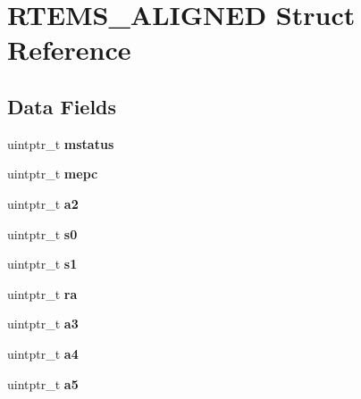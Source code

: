 \hypertarget{structRTEMS__ALIGNED}{}\section{R\+T\+E\+M\+S\+\_\+\+A\+L\+I\+G\+N\+ED Struct Reference}
\label{structRTEMS__ALIGNED}
\subsection*{Data Fields}
\begin{DoxyCompactItemize}
\item 
\mbox{\label{structRTEMS__ALIGNED_ab1aeee5e3cc62d6ea87d066061228938}} 
uintptr\+\_\+t {\bfseries mstatus}
\item 
\mbox{\label{structRTEMS__ALIGNED_a2bf8b77eea08bf08de9a73d4ec26b86b}} 
uintptr\+\_\+t {\bfseries mepc}
\item 
\mbox{\label{structRTEMS__ALIGNED_a78f41eb13460a85fbfe9b8057d766584}} 
uintptr\+\_\+t {\bfseries a2}
\item 
\mbox{\label{structRTEMS__ALIGNED_ac80572a879b3ad227641b200e229396c}} 
uintptr\+\_\+t {\bfseries s0}
\item 
\mbox{\label{structRTEMS__ALIGNED_a06d202b1bf4c6d5bd80d7486503e8804}} 
uintptr\+\_\+t {\bfseries s1}
\item 
\mbox{\label{structRTEMS__ALIGNED_a9afcf738bfd01d583e771063e6ec1c12}} 
uintptr\+\_\+t {\bfseries ra}
\item 
\mbox{\label{structRTEMS__ALIGNED_a134978fa13c4b2bd85a0c7ef911da3cd}} 
uintptr\+\_\+t {\bfseries a3}
\item 
\mbox{\label{structRTEMS__ALIGNED_a6bbf5a8c6fdfc1f308fa1a2071355894}} 
uintptr\+\_\+t {\bfseries a4}
\item 
\mbox{\label{structRTEMS__ALIGNED_afb0fe5a816193d27b274a34fb8c31cff}} 
uintptr\+\_\+t {\bfseries a5}
\item 
\mbox{\label{structRTEMS__ALIGNED_a74062ae69d1109861c608758aba94961}} 

\end{DoxyCompactItemize}
